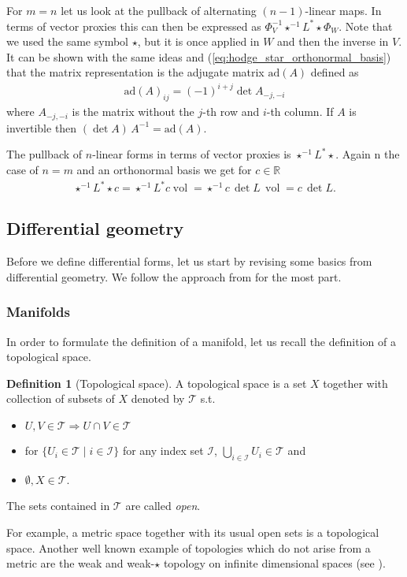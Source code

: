 \documentclass[12pt,a4paper]{article}
\numberwithin{equation}{subsection}
\numberwithin{lemma}{subsection}
\theoremstyle{definition}
\newtheorem{definition}[lemma]{Definition}
\DeclareMathOperator{\vol}{vol}
\newcommand{\real}{\mathbb{R}}
\begin{document}
For $m=n$ let us look at the pullback of alternating $(n-1)$-linear maps.
In terms of vector proxies this can then be expressed as 
$\Phi_V^{-1} \star^{-1} L^* \star \Phi_W$. Note that we used the same symbol 
$\star$, but it is once applied in $W$ and then the inverse in $V$. It 
can be shown with the same ideas and (\ref{eq:hodge_star_orthonormal_basis})
that the matrix representation is the adjugate matrix 
$\text{ad}(A)$ defined as 
\begin{align*}
    \text{ad}(A)_{ij} = (-1)^{i+j} \det A_{-j,-i}
\end{align*} 
where $A_{-j,-i}$ is the matrix without the $j$-th row and $i$-th column.
If $A$ is invertible then $(\det A)\,A^{-1} =  \text{ad}(A)$. 

The pullback of $n$-linear forms in terms of vector proxies is 
$\star^{-1} L^* \star$. Again n the case of $n=m$ and an 
orthonormal basis we get for $c \in \real$
\begin{align*}
    \star^{-1} L^* \star c = \star^{-1} L^* c \vol 
    = \star^{-1} c\,\det L \,\vol = c\,\det L.
\end{align*}

\subsection{Differential geometry}\label{sec:differential_geometry}

Before we define differential forms, let us start by revising some basics
from differential geometry. We follow the approach from 
\cite[Sec. II]{topology_and_geometry} for the most part. 

\subsubsection{Manifolds}

In order to formulate the definition of a manifold, let us recall the 
definition of a topological space.
\begin{definition}[Topological space]
    A topological space is a set $X$ together with collection of subsets of 
    $X$ denoted by $\mathcal{T}$ s.t.
    \begin{itemize}
        \item $U,V \in \mathcal{T} \Rightarrow U \cap V \in \mathcal{T}$
        \item for $\{ U_i \in \mathcal{T} \mid i \in \mathcal{I} \}$
            for any index set $\mathcal{I}$, 
            $\bigcup_{i\in \mathcal{I}} U_i \in \mathcal{T}$ and
        \item $\emptyset, X \in \mathcal{T}$.
    \end{itemize}
    The sets contained in $\mathcal{T}$ are called \textit{open}.
\end{definition}
For example, a metric space together with its usual open sets is a topological
space. Another well known example of topologies which do not arise from a metric
are the weak and weak-$\star$ topology on infinite dimensional spaces
(see \cite[Ch.\,3]{brezis}).
\end{document}
